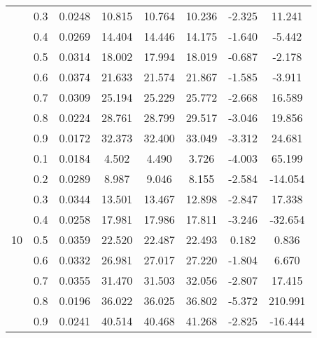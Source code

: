 \documentclass[11pt,a4paper]{report}
\begin{document}
\begin{longtable}{ | c | c || c | c | c | c | c | c | }
 & 0.3 & 0.0248 & 10.815 & 10.764 & 10.236 & -2.325 & 11.241 \\
 & 0.4 & 0.0269 & 14.404 & 14.446 & 14.175 & -1.640 & -5.442 \\
 & 0.5 & 0.0314 & 18.002 & 17.994 & 18.019 & -0.687 & -2.178 \\
 & 0.6 & 0.0374 & 21.633 & 21.574 & 21.867 & -1.585 & -3.911 \\
 & 0.7 & 0.0309 & 25.194 & 25.229 & 25.772 & -2.668 & 16.589 \\
 & 0.8 & 0.0224 & 28.761 & 28.799 & 29.517 & -3.046 & 19.856 \\
 & 0.9 & 0.0172 & 32.373 & 32.400 & 33.049 & -3.312 & 24.681 \\
 \hline
\multirow{9}{*}{10} & 0.1 & 0.0184 & 4.502 & 4.490 & 3.726 & -4.003 & 65.199 \\
 & 0.2 & 0.0289 & 8.987 & 9.046 & 8.155 & -2.584 & -14.054 \\
 & 0.3 & 0.0344 & 13.501 & 13.467 & 12.898 & -2.847 & 17.338 \\
 & 0.4 & 0.0258 & 17.981 & 17.986 & 17.811 & -3.246 & -32.654 \\
 & 0.5 & 0.0359 & 22.520 & 22.487 & 22.493 & 0.182 & 0.836 \\
 & 0.6 & 0.0332 & 26.981 & 27.017 & 27.220 & -1.804 & 6.670 \\
 & 0.7 & 0.0355 & 31.470 & 31.503 & 32.056 & -2.807 & 17.415 \\
 & 0.8 & 0.0196 & 36.022 & 36.025 & 36.802 & -5.372 & 210.991 \\
 & 0.9 & 0.0241 & 40.514 & 40.468 & 41.268 & -2.825 & -16.444 \\
 \hline
\hline
\end{longtable}
\end{document}
